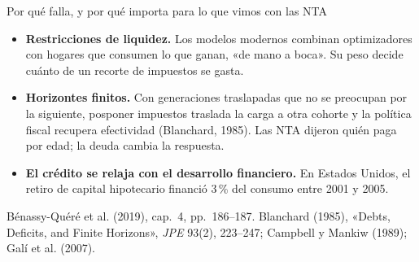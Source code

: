 \documentclass[aspectratio=169,11pt]{beamer}
\newcommand{\fuente}[1]{\par\vfill{\small\color{cGris}#1\par}}
\newcommand{\BQ}{Bénassy-Quéré et al. (2019), cap.~4}
\begin{document}
\begin{frame}{Por qué falla, y por qué importa para lo que vimos con las NTA}
  \begin{itemize}
    \item<1-> \textbf{Restricciones de liquidez.} Los modelos modernos combinan optimizadores con hogares que consumen lo que ganan, «de mano a boca». Su peso decide cuánto de un recorte de impuestos se gasta.
    \item<2-> \textbf{Horizontes finitos.} Con generaciones traslapadas que no se preocupan por la siguiente, posponer impuestos traslada la carga a otra cohorte y la política fiscal recupera efectividad (Blanchard, 1985). Las NTA dijeron quién paga por edad; la deuda cambia la respuesta.
    \item<3-> \textbf{El crédito se relaja con el desarrollo financiero.} En Estados Unidos, el retiro de capital hipotecario financió 3\,\% del consumo entre 2001 y 2005.
  \end{itemize}
  \fuente{\BQ, pp.~186--187. Blanchard (1985), «Debts, Deficits, and Finite Horizons», \emph{JPE} 93(2), 223--247; Campbell y Mankiw (1989); Galí et al. (2007).}
\end{frame}
\end{document}
